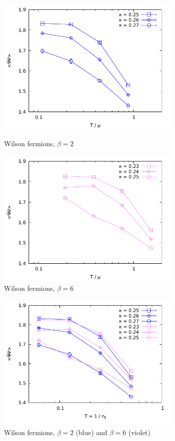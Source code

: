 \documentclass[12pt,a4paper]{article}
\begin{document}
\begin{figure}[ht]
  \centering
  \includegraphics[width=0.8\textwidth]{Wilson/pbp-b02-mu}
  \caption{Wilson fermions, $\beta = 2$}
  \label{fig:wilson-beta2}
  \vspace{1.5cm}
  \includegraphics[width=0.8\textwidth]{Wilson/pbp-b06-mu}
  \caption{Wilson fermions, $\beta = 6$}
  \label{fig:wilson-beta6}
\end{figure}

\begin{figure}[t]
  \centering
  \includegraphics[width=0.8\textwidth]{Wilson/pbp-all}
  \caption{Wilson fermions, $\beta = 2$ (blue) and $\beta = 6$ (violet)}
  \label{fig:wilson-all-beta}
\end{figure}


{}
\end{document}
